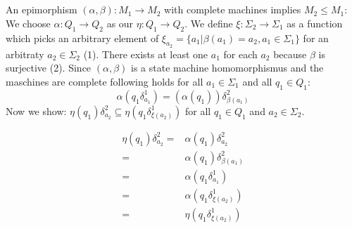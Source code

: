 \documentclass[a4paper,12pt,numbers=noenddot]{scrreport}
\begin{document}

\chapter{}
\section{}
\section{}
An epimorphism $(\alpha, \beta): M_1 \rightarrow M_2$ with complete machines implies $M_2 \leq M_1$: \\
We choose $\alpha : Q_1 \rightarrow Q_2$ as our $\eta: Q_1 \rightarrow Q_2$.
We define $\xi: \Sigma_2 \rightarrow \Sigma_1$ as a function which picks an arbitrary element of $\xi_{a_2} = \{a_1 | \beta(a_1) = a_2, a_1 \in \Sigma_1\}$ for an arbitraty $a_2 \in \Sigma_2$ (1).
There exists at least one $a_1$ for each $a_2$ because $\beta$ is surjective (2).
Since $(\alpha,\beta)$ is a state machine homomorphismus and the maschines are complete following holds for all $a_1 \in \Sigma_1$ and all $q_1 \in Q_1$:
$$
\alpha(q_1\delta^1_{a_1}) = (\alpha(q_1))\delta^2_{\beta(a_1)}
$$ 
Now we show: $\eta(q_1)\delta^2_{a_2} \subseteq \eta(q_1\delta^1_{\xi(a_2)})$ for all $q_1 \in Q_1$ and $a_2 \in \Sigma_2$.

\begin{align*}
    \eta(q_1)\delta^2_{a_2} = & \alpha(q_1)\delta^2_{a_2} \\
                 = & \alpha(q_1)\delta^2_{\beta(a_1)} \label{eq1}\tag{2} \\
                 = & \alpha(q_1\delta^1_{a_1}) \\
                 = & \alpha(q_1\delta^1_{\xi(a_2)})\label{eq2}\tag{1} \\
                 = & \eta(q_1\delta^1_{\xi(a_2)})
\end{align*}
\section{}
\end{document}
